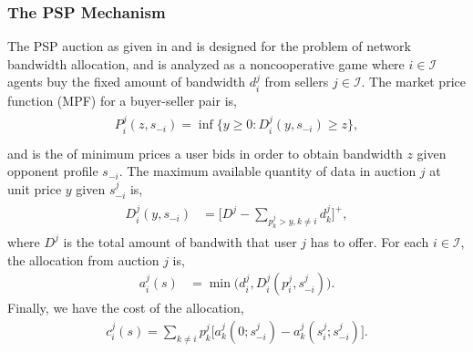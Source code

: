 \documentclass[12pt]{article}
\theoremstyle{definition}
\newcommand{\mcI}{\mathcal{I}}
\begin{document}
\begin{multicols}{2}
\subsubsection{The PSP Mechanism}\label{mechanism}
The PSP auction as given in \cite{lazar} and \cite{semret} is designed for the
problem of network bandwidth allocation, and is analyzed as a noncooperative
game where $i\in\mcI$ agents buy the
fixed amount of bandwidth $d_i^j$ from sellers $j\in\mcI$.
The market price function (MPF) for a buyer-seller pair is,
\begin{align}\label{dataprice}
\begin{split}
    P_i^j(z, s_{-i})= \inf\bigg\lbrace y\ge 0 : D_i^j(y, s_{-i}) \ge z \bigg\rbrace,\\
\end{split}
\end{align}
and is the of minimum prices a user bids in
order to obtain bandwidth $z$ given opponent profile $s_{-i}$. 
The maximum available quantity of data in auction
$j$ at unit price $y$ given $s_{-i}^j$ is,
\begin{align}\label{datapriceinverse}
\begin{split}
    D_i^j(y, s_{-i}) &= \bigg[ D^j - \sum_{p_k^j>y,k\ne i} d_k^j  \bigg]^+,
\end{split}
\end{align}
where $D^j$ is the total amount of bandwith that user $j$ has to offer.
For each $i \in \mcI$, the allocation from auction $j$ is,
\begin{align}\label{dataallocation}
    a_i^j(s) &= \min\bigg( d_i^j, 
    D_i^j(p_i^j,s_{-i}^j)\bigg).
\end{align}
Finally, we have the cost of the allocation,
\begin{align}\label{datacost}
    c_i^j(s) = \displaystyle\sum_{k\ne i} 
p_k^j \big[a_k^j(0; s_{-i}^j)
    -a_k^j(s_i^j;s_{-i}^j)\big].
\end{align}


\end{multicols}
\end{document}
